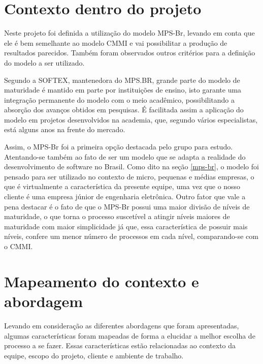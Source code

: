   \section{Contexto dentro do projeto}
Neste projeto foi definida a utilização do modelo MPS-Br, levando em conta que ele é bem semelhante ao modelo CMMI e vai possibilitar a produção de resultados parecidos. Também foram observados outros critérios para a definição do modelo a ser utilizado.

Segundo a SOFTEX, mantenedora do MPS.BR, grande parte do modelo de maturidade é mantido em parte por instituições de ensino, isto garante uma integração permanente do modelo com o meio acadêmico, possibilitando a absorção dos avanços obtidos em pesquisas. É facilitada assim a aplicação do modelo em projetos desenvolvidos na academia, que, segundo vários especialistas, está alguns anos na frente do mercado. 

Assim, o MPS-Br foi a primeira opção destacada pelo grupo para estudo. Atentando-se também ao fato de ser um modelo que se adapta a realidade do desenvolvimento de software no Brasil. Como dito na seção \ref{mps-br}, o modelo foi pensado para ser utilizado no contexto de micro, pequenas e médias empresas, o que é virtualmente a característica da presente equipe, uma vez que o nosso cliente é uma empresa júnior de engenharia eletrônica. Outro fator que vale a pena destacar é o fato de que o MPS-Br possui uma maior divisão de níveis de maturidade, o que torna o processo suscetível a atingir níveis maiores de maturidade com maior simplicidade já que, essa característica de possuir mais níveis, confere um menor número de processos em cada nível, comparando-se com o CMMI.
\section{Mapeamento do contexto e abordagem}
Levando em consideração as diferentes abordagens que foram apresentadas, algumas características foram mapeadas de forma a elucidar a melhor escolha de processo a se fazer. Essas características estão relacionadas ao contexto da equipe, escopo do projeto, cliente e ambiente de trabalho.

